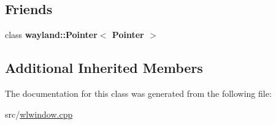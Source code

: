 \subsection*{Friends}
\begin{DoxyCompactItemize}
\item 
\mbox{\label{classwlwin_1_1Pointer_a279e4310a52ab6abeb11dc58318f3915}} 
class {\bfseries wayland\+::\+Pointer$<$ Pointer $>$}
\end{DoxyCompactItemize}
\subsection*{Additional Inherited Members}


The documentation for this class was generated from the following file\+:\begin{DoxyCompactItemize}
\item 
src/\mbox{\hyperlink{wlwindow_8cpp}{wlwindow.\+cpp}}\end{DoxyCompactItemize}
